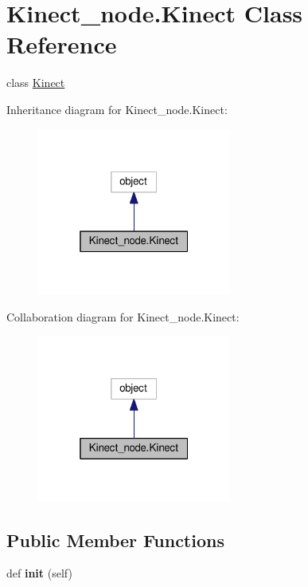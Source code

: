 \hypertarget{classKinect__node_1_1Kinect}{}\section{Kinect\+\_\+node.\+Kinect Class Reference}
\label{classKinect__node_1_1Kinect}


class \hyperlink{classKinect__node_1_1Kinect}{Kinect}  




Inheritance diagram for Kinect\+\_\+node.\+Kinect\+:
\nopagebreak
\begin{figure}[H]
\begin{center}
\leavevmode
\includegraphics[width=181pt]{classKinect__node_1_1Kinect__inherit__graph}
\end{center}
\end{figure}


Collaboration diagram for Kinect\+\_\+node.\+Kinect\+:
\nopagebreak
\begin{figure}[H]
\begin{center}
\leavevmode
\includegraphics[width=181pt]{classKinect__node_1_1Kinect__coll__graph}
\end{center}
\end{figure}
\subsection*{Public Member Functions}
\begin{DoxyCompactItemize}
\item 
def {\bfseries init} (self)\hypertarget{classKinect__node_1_1Kinect_a89f83988b18b58069ad77bb441616524}{}\label{classKinect__node_1_1Kinect_a89f83988b18b58069ad77bb441616524}

\end{DoxyCompactItemize}
